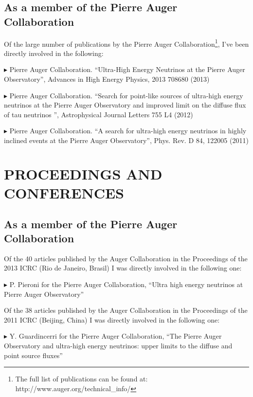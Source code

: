 \documentclass[letterpaper]{article}
\renewenvironment{itemize}{
  \begin{list}{}{
    \setlength{\leftmargin}{1.5em}
  }
}{
  \end{list}
}
\begin{document}
\subsection*{As a member of the Pierre Auger Collaboration}
Of the large number of publications by the Pierre Auger Collaboration\footnote{The full list of publications can be found at: http://www.auger.org/technical\_info/}, I've been directly involved in the following:
\begin{itemize} %

 \item{$\blacktriangleright$} Pierre Auger Collaboration. ``Ultra-High Energy Neutrinos at the Pierre Auger Observatory'', Advances in High Energy Physics, 2013 708680 (2013)
 
 \item{$\blacktriangleright$} Pierre Auger Collaboration. ``Search for point-like sources of ultra-high energy neutrinos at the Pierre Auger Observatory and improved limit on the diffuse flux of tau neutrinos '', Astrophysical Journal Letters 755 L4 (2012)
 
 \item{$\blacktriangleright$} Pierre Auger Collaboration. ``A search for ultra-high energy neutrinos in highly inclined events at the Pierre Auger Observatory'', Phys. Rev. D 84, 122005 (2011)
 
\end{itemize}

 
\section*{PROCEEDINGS AND CONFERENCES} 
\subsection*{As a member of the Pierre Auger Collaboration}

Of the 40 articles published by the Auger Collaboration in the Proceedings of the 2013 ICRC (Rio de Janeiro, Brasil) I was directly involved in the following one:
 \begin{itemize}%
  \item{$\blacktriangleright$} P. Pieroni for the Pierre Auger Collaboration, ``Ultra high energy neutrinos at Pierre Auger Observatory''
 \end{itemize}

Of the 38 articles published by the Auger Collaboration in the Proceedings of the 2011 ICRC (Beijing, China) I was directly involved in the following one:
 \begin{itemize}%
  \item{$\blacktriangleright$} Y. Guardincerri for the Pierre Auger Collaboration, ``The Pierre Auger Observatory and ultra-high energy neutrinos: upper limits to the diffuse and point source fluxes''
 \end{itemize}
\end{document}
